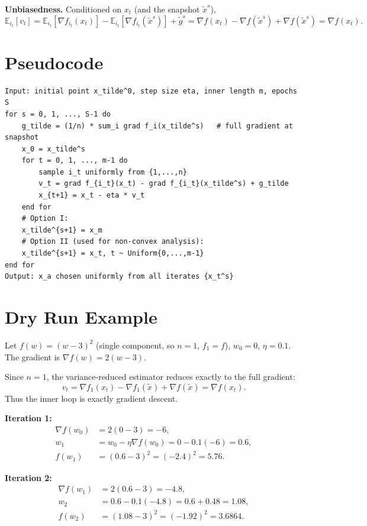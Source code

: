 \documentclass[11pt]{article}
\begin{document}
\textbf{Unbiasedness.} Conditioned on $x_t$ (and the snapshot $\tilde{x}^s$),
\[
\mathbb{E}_{i_t}[v_t]
= \mathbb{E}_{i_t}[\nabla f_{i_t}(x_t)] - \mathbb{E}_{i_t}[\nabla f_{i_t}(\tilde{x}^s)] + \tilde{g}^s
= \nabla f(x_t) - \nabla f(\tilde{x}^s) + \nabla f(\tilde{x}^s) = \nabla f(x_t).
\]

\section*{Pseudocode}

\begin{verbatim}
Input: initial point x_tilde^0, step size eta, inner length m, epochs S
for s = 0, 1, ..., S-1 do
    g_tilde = (1/n) * sum_i grad f_i(x_tilde^s)   # full gradient at snapshot
    x_0 = x_tilde^s
    for t = 0, 1, ..., m-1 do
        sample i_t uniformly from {1,...,n}
        v_t = grad f_{i_t}(x_t) - grad f_{i_t}(x_tilde^s) + g_tilde
        x_{t+1} = x_t - eta * v_t
    end for
    # Option I:
    x_tilde^{s+1} = x_m
    # Option II (used for non-convex analysis):
    x_tilde^{s+1} = x_t, t ~ Uniform{0,...,m-1}
end for
Output: x_a chosen uniformly from all iterates {x_t^s}
\end{verbatim}

\section*{Dry Run Example}

Let $f(w) = (w-3)^2$ (single component, so $n=1$, $f_1=f$),
$w_0 = 0$, $\eta = 0.1$. The gradient is $\nabla f(w) = 2(w-3)$.

Since $n=1$, the variance-reduced estimator reduces exactly to the full gradient:
\[
v_t = \nabla f_{1}(x_t) - \nabla f_{1}(\tilde{x}) + \nabla f(\tilde{x}) = \nabla f(x_t).
\]
Thus the inner loop is exactly gradient descent.

\textbf{Iteration 1:}
\begin{align*}
\nabla f(w_0) &= 2(0-3) = -6,\\
w_1 &= w_0 - \eta \nabla f(w_0) = 0 - 0.1(-6) = 0.6,\\
f(w_1) &= (0.6-3)^2 = ( -2.4)^2 = 5.76.
\end{align*}

\textbf{Iteration 2:}
\begin{align*}
\nabla f(w_1) &= 2(0.6-3) = -4.8,\\
w_2 &= 0.6 - 0.1(-4.8) = 0.6 + 0.48 = 1.08,\\
f(w_2) &= (1.08-3)^2 = (-1.92)^2 = 3.6864.
\end{align*}
\end{document}
